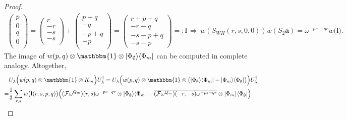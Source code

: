 \documentclass[10pt,a4paper]{amsart}
\def\F{\mathcal{F}}
\def\Id{\mathbbm{1}}
\renewcommand{\vec}{\mathbf}
\begin{document}
\begin{proof}
\begin{align*}
\begin{pmatrix}
			p\\
			0\\
			q\\
			0\\
		\end{pmatrix}
		=
		\begin{pmatrix}
			r\\
			-r\\
			-s\\
			-s\\
		\end{pmatrix}
		+
		\begin{pmatrix}
			p+q\\
			-q\\
			-p+q\\
			-p\\
		\end{pmatrix}
		=
		\begin{pmatrix}
			r+p+q\\
			-r-q\\
			-s-p+q\\
			-s-p
		\end{pmatrix}
		=: \vec l
		\,\Rightarrow\,
		w(S_{WH} (r,s,0,0)) w(S_2 \vec a)
		=
		\omega^{-ps-qr}    %
		w\big(\vec l\big).
	\end{align*}
	The image of $ w(p,q)\otimes\Id \otimes |\Phi_\emptyset\rangle\langle\Phi_m|$ can be computed in complete analogy.
	Altogether,
	\begin{align}%
		&
		U_\lambda
		\Big(
			w(p,q)\otimes\Id
			\otimes 
			K_m
		\Big)
		U_\lambda^\dagger
		=
		U_\lambda
		\Big(
			w(p,q)\otimes\Id
			\otimes 
			\big(
				|\Phi_\emptyset\rangle\langle\Phi_m|
				-
				|\Phi_m\rangle\langle\Phi_\emptyset|
			\big)
		\Big)
		U_\lambda^\dagger
		\nonumber \\
		=&
			\frac1{3}
			\sum_{r,s}
			w\big(\vec l(r,s,p,q)\big)
		\Big(
			(\F \omega^{Q_m})(r,s)
				\omega^{-ps-qr}
				\otimes 
				|\Phi_\emptyset\rangle\langle\Phi_m|
				-
				\overline{(\F \omega^{Q_m})(-r,-s) \omega^{-ps-qr}}
				\otimes 
				|\Phi_m\rangle\langle\Phi_\emptyset|
			\Big). \label{eqn:k_deloc_res}
	\end{align}


\end{proof}
\end{document}
